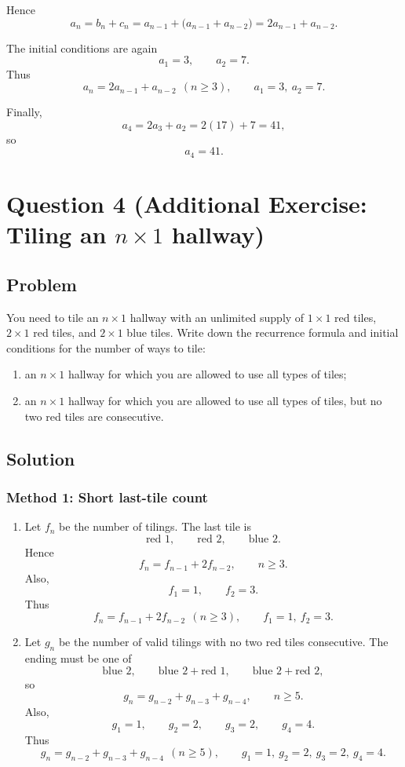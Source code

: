 \documentclass[12pt]{article}
\begin{document}
Hence
\[
a_n=b_n+c_n=a_{n-1}+\bigl(a_{n-1}+a_{n-2}\bigr)=2a_{n-1}+a_{n-2}.
\]

The initial conditions are again
\[
a_1=3,\qquad a_2=7.
\]
Thus
\[
\boxed{a_n=2a_{n-1}+a_{n-2}\ \ (n\ge 3), \qquad a_1=3,\ a_2=7.}
\]

Finally,
\[
a_4=2a_3+a_2=2(17)+7=41,
\]
so
\[
\boxed{a_4=41.}
\]

\newpage

\section{Question 4 (Additional Exercise: Tiling an \(n\times 1\) hallway)}

\subsection{Problem}
You need to tile an \(n\times 1\) hallway with an unlimited supply of \(1\times 1\) red tiles, \(2\times 1\) red tiles, and \(2\times 1\) blue tiles. Write down the recurrence formula and initial conditions for the number of ways to tile:
\begin{enumerate}[label=(\alph*)]
\item an \(n\times 1\) hallway for which you are allowed to use all types of tiles;
\item an \(n\times 1\) hallway for which you are allowed to use all types of tiles, but no two red tiles are consecutive.
\end{enumerate}

\subsection{Solution}

\subsubsection*{Method 1: Short last-tile count}
\begin{enumerate}[label=(\alph*)]
\item Let \(f_n\) be the number of tilings. The last tile is
\[
\text{red }1,\qquad \text{red }2,\qquad \text{blue }2.
\]
Hence
\[
f_n=f_{n-1}+2f_{n-2}, \qquad n\ge 3.
\]
Also,
\[
f_1=1,\qquad f_2=3.
\]
Thus
\[
\boxed{f_n=f_{n-1}+2f_{n-2}\ \ (n\ge 3),\qquad f_1=1,\ f_2=3.}
\]

\item Let \(g_n\) be the number of valid tilings with no two red tiles consecutive. The ending must be one of
\[
\text{blue }2,\qquad \text{blue }2+\text{red }1,\qquad \text{blue }2+\text{red }2,
\]
so
\[
g_n=g_{n-2}+g_{n-3}+g_{n-4}, \qquad n\ge 5.
\]
Also,
\[
g_1=1,\qquad g_2=2,\qquad g_3=2,\qquad g_4=4.
\]
Thus
\[
\boxed{g_n=g_{n-2}+g_{n-3}+g_{n-4}\ \ (n\ge 5),\qquad g_1=1,\ g_2=2,\ g_3=2,\ g_4=4.}
\]
\end{enumerate}
\end{document}
